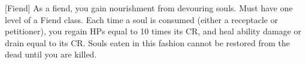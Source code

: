  {[Fiend]}
\shortdescfeat
{As a fiend, you gain nourishment from devouring souls.}
{Must have one level of a Fiend class.}
{Each time a soul is consumed (either a receptacle or petitioner), you regain HPs equal to 10 times its CR, and heal ability damage or drain equal to its CR. Souls eaten in this fashion cannot be restored from the dead until you are killed.}